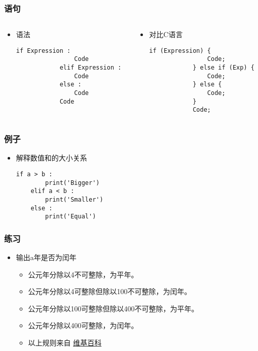 \begin{frame} [fragile]
	\frametitle{语句}
	\linespread{1.5}
	\begin{columns}[T]
		\begin{column}[T]{.5\textwidth}
			\begin{itemize}
			\item 语法
			\begin{lstlisting}[style=pythonstyle, gobble=12]
			if Expression :
				Code
			elif Expression :
				Code
			else :
				Code
			Code
			\end{lstlisting}
			\end{itemize}
		\end{column}
		\begin{column}[T]{.5\textwidth}
			\begin{itemize}
			\item 对比C语言
			\begin{lstlisting}[style=cstyle, gobble=12]
			if (Expression) {
				Code;
			} else if (Exp) {
				Code;
			} else {
				Code;
			}
			Code;
			\end{lstlisting}
			\end{itemize}
		\end{column}
	\end{columns}
\end{frame}

\begin{frame} [fragile]
	\frametitle{例子}
	\linespread{1.25}
	\begin{itemize}
	\item 解释数值和的大小关系
	\begin{lstlisting}[style=pythonstyle, gobble=4]
	if a > b :
		print('Bigger')
	elif a < b :
		print('Smaller')
	else :
		print('Equal')
	\end{lstlisting}
	\end{itemize}
\end{frame}

\begin{frame} [fragile]
	\frametitle{练习}
	\linespread{1.5}
	\begin{itemize}
	\item 输出a年是否为闰年
		\begin{itemize}
		\item 公元年分除以4不可整除，为平年。
		\item 公元年分除以4可整除但除以100不可整除，为闰年。
		\item 公元年分除以100可整除但除以400不可整除，为平年。
		\item 公元年分除以400可整除，为闰年。
		\item 以上规则来自
				\href{https://zh.wikipedia.org/wiki/\%E9\%97\%B0\%E5\%B9\%B4}
					{维基百科}
		\end{itemize}
	\end{itemize}
\end{frame}

